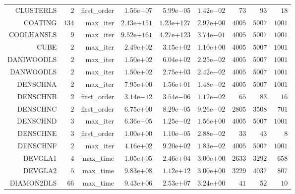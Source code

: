 \begin{longtable}{rrrrrrrrr}
CLUSTERLS & \(     2\) & first\_order & \( 1.56\)e\(-07\) & \( 5.99\)e\(-05\) & \( 1.42\)e\(-02\) & \(    73\) & \(    93\) & \(    18\) \\
COATING & \(   134\) & max\_iter & \(2.43\)e\(+151\) & \(1.23\)e\(+127\) & \( 2.92\)e\(+00\) & \(  4005\) & \(  5007\) & \(  1001\) \\
COOLHANSLS & \(     9\) & max\_iter & \(9.52\)e\(+161\) & \(4.27\)e\(+123\) & \( 3.74\)e\(-01\) & \(  4005\) & \(  5007\) & \(  1001\) \\
CUBE & \(     2\) & max\_iter & \( 2.49\)e\(+02\) & \( 3.15\)e\(+02\) & \( 1.10\)e\(+00\) & \(  4005\) & \(  5007\) & \(  1001\) \\
DANIWOODLS & \(     2\) & max\_iter & \( 1.50\)e\(+02\) & \( 6.04\)e\(+02\) & \( 2.25\)e\(-02\) & \(  4005\) & \(  5007\) & \(  1001\) \\
DANWOODLS & \(     2\) & max\_iter & \( 1.50\)e\(+02\) & \( 2.75\)e\(+03\) & \( 2.42\)e\(-02\) & \(  4005\) & \(  5007\) & \(  1001\) \\
DENSCHNA & \(     2\) & max\_iter & \( 7.95\)e\(+00\) & \( 1.56\)e\(+01\) & \( 1.48\)e\(-02\) & \(  4005\) & \(  5007\) & \(  1001\) \\
DENSCHNB & \(     2\) & first\_order & \( 3.14\)e\(-12\) & \( 3.54\)e\(-06\) & \( 1.12\)e\(-02\) & \(    65\) & \(    83\) & \(    16\) \\
DENSCHNC & \(     2\) & first\_order & \( 6.75\)e\(+00\) & \( 8.29\)e\(-05\) & \( 9.26\)e\(-02\) & \(  2805\) & \(  3508\) & \(   701\) \\
DENSCHND & \(     3\) & max\_iter & \( 6.36\)e\(-05\) & \( 1.25\)e\(-02\) & \( 1.56\)e\(+00\) & \(  4005\) & \(  5007\) & \(  1001\) \\
DENSCHNE & \(     3\) & first\_order & \( 1.00\)e\(+00\) & \( 1.10\)e\(-05\) & \( 2.88\)e\(-02\) & \(    33\) & \(    43\) & \(     8\) \\
DENSCHNF & \(     2\) & max\_iter & \( 4.16\)e\(+02\) & \( 9.20\)e\(+02\) & \( 1.83\)e\(-02\) & \(  4005\) & \(  5007\) & \(  1001\) \\
DEVGLA1 & \(     4\) & max\_time & \( 1.05\)e\(+05\) & \( 2.46\)e\(+04\) & \( 3.00\)e\(+00\) & \(  2633\) & \(  3292\) & \(   658\) \\
DEVGLA2 & \(     5\) & max\_time & \( 9.83\)e\(+08\) & \( 1.12\)e\(+12\) & \( 3.00\)e\(+00\) & \(  3229\) & \(  4037\) & \(   807\) \\
DIAMON2DLS & \(    66\) & max\_time & \( 9.43\)e\(+06\) & \( 2.53\)e\(+07\) & \( 3.24\)e\(+00\) & \(    41\) & \(    52\) & \(    10\) \\

\end{longtable}
